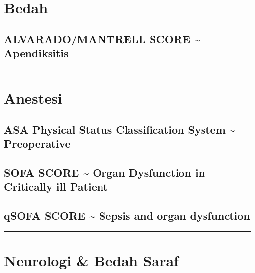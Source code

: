 \documentclass[
]{book}
\begin{document}
\hypertarget{bedah}{%
\section{Bedah}\label{bedah}}

\hypertarget{alvaradomantrell-score-apendiksitis}{%
\subsection{ALVARADO/MANTRELL SCORE \textasciitilde{} Apendiksitis}\label{alvaradomantrell-score-apendiksitis}}

\begin{center}\rule{0.5\linewidth}{0.5pt}\end{center}

\hypertarget{anestesi}{%
\section{Anestesi}\label{anestesi}}

\hypertarget{asa-physical-status-classification-system-preoperative}{%
\subsection{ASA Physical Status Classification System \textasciitilde{} Preoperative}\label{asa-physical-status-classification-system-preoperative}}

\hypertarget{sofa-score-organ-dysfunction-in-critically-ill-patient}{%
\subsection{SOFA SCORE \textasciitilde{} Organ Dysfunction in Critically ill Patient}\label{sofa-score-organ-dysfunction-in-critically-ill-patient}}

\hypertarget{qsofa-score-sepsis-and-organ-dysfunction}{%
\subsection{qSOFA SCORE \textasciitilde{} Sepsis and organ dysfunction}\label{qsofa-score-sepsis-and-organ-dysfunction}}

\begin{center}\rule{0.5\linewidth}{0.5pt}\end{center}

\hypertarget{neurologi-bedah-saraf}{%
\section{Neurologi \& Bedah Saraf}\label{neurologi-bedah-saraf}}
\end{document}
